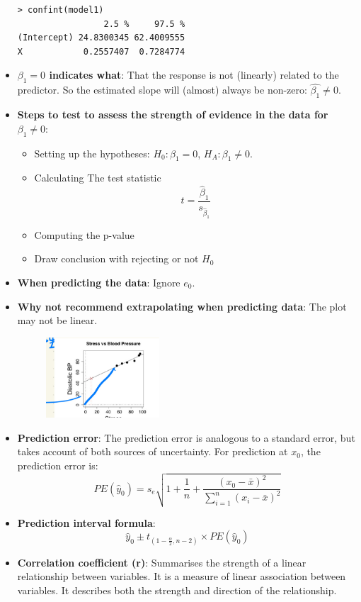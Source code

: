 \documentclass[12pt]{article}
\begin{document}
\begin{itemize}
\begin{mdframed}[backgroundcolor=gray!15, linecolor=black]
\begin{verbatim}
> confint(model1)
                 2.5 %     97.5 %
(Intercept) 24.8300345 62.4009555
X            0.2557407  0.7284774
\end{verbatim}
\end{mdframed}
\item \textbf{$\beta_1 = 0$ indicates what}: That the response is not (linearly) related to the predictor. So the estimated slope will (almost) always be non-zero: $\hat{\beta_1} \neq 0$.
\item \textbf{Steps to test to assess the strength of evidence in the data for $\beta_1 \neq 0$}:
\begin{itemize}
\item Setting up the hypotheses: $H_0 : \beta_1 = 0$, $H_A : \beta_1 \neq 0$.
\item Calculating The test statistic
$$t = \frac{\hat{\beta}_1}{s_{\hat{\beta}_1}}$$
\item Computing the p-value
\item Draw conclusion with rejecting or not $H_0$
\end{itemize}
\item \textbf{When predicting the data}: Ignore $e_0$.
\item \textbf{Why not recommend extrapolating when predicting data}: The plot may not be linear.
\begin{figure}[H]
    \centering
    \includegraphics[width=0.4\textwidth]{7.jpg}
\end{figure}
\item \textbf{Prediction error}: The prediction error is analogous to a standard error, but takes account of both sources of uncertainty. For prediction at $x_0$, the prediction error is: 
$$PE(\hat{y}_0) = s_e\sqrt{1 + \frac{1}{n} + \frac{(x_0 - \bar{x})^2}{\sum_{i=1}^{n}(x_i - \bar{x})^2}}$$
\item \textbf{Prediction interval formula}:
$$\hat{y}_0 \pm t_{(1-\frac{\alpha}{2}, n-2)} \times PE(\hat{y}_0)$$
\item \textbf{Correlation coefficient (r)}: Summarises the strength of a linear relationship between variables. It is a measure of linear association between variables. It describes both the strength and direction of the relationship.

\end{itemize}
\end{document}
